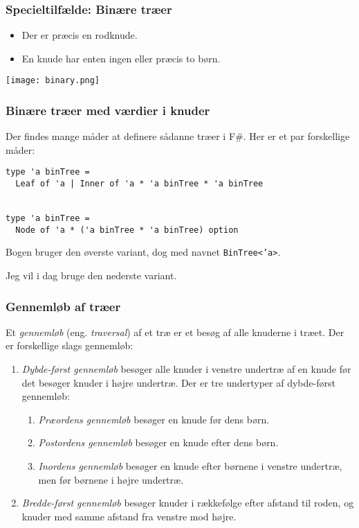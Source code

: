 \documentclass{beamer}
\begin{document}
\begin{frame}[fragile=singleslide]
\frametitle{Specieltilfælde: Binære træer}

\begin{itemize}
\item Der er præcis en rodknude.
\item En knude har enten ingen eller præcis to børn.
\end{itemize}

\begin{center}
\texttt{[image: binary.png]}
\end{center}


\end{frame}

\begin{frame}[fragile=singleslide]
\frametitle{Binære træer med værdier i knuder}

Der findes mange måder at definere sådanne træer i F\#.  Her er et par
forskellige måder:

\begin{verbatim}
type 'a binTree =
  Leaf of 'a | Inner of 'a * 'a binTree * 'a binTree


type 'a binTree =
  Node of 'a * ('a binTree * 'a binTree) option
\end{verbatim}

Bogen bruger den øverste variant, dog med navnet \texttt{BinTree<'a>}.

Jeg vil i dag bruge den nederste variant.

\end{frame}

\begin{frame}%
\frametitle{Gennemløb af træer}

Et \emph{gennemløb} (eng. \emph{traversal}) af et træ er et besøg af alle
knuderne i træet.  Der er forskellige slags gennemløb:

\begin{enumerate}
\item \emph{Dybde-først gennemløb} besøger alle knuder i venstre
  undertræ af en knude før det besøger knuder i højre undertræ.  Der
  er tre undertyper af dybde-først gennemløb:

  \begin{enumerate}
  \item \emph{Præordens gennemløb} besøger en knude før dens børn.
  \item \emph{Postordens gennemløb} besøger en knude efter dens børn.
  \item \emph{Inordens gennemløb} besøger en knude efter børnene i
    venstre undertræ, men før børnene i højre undertræ.
  \end{enumerate}
\item \emph{Bredde-først gennemløb} besøger knuder i rækkefølge efter
  afstand til roden, og knuder med samme afstand fra venstre mod højre.
\end{enumerate}

\end{frame}
\end{document}
